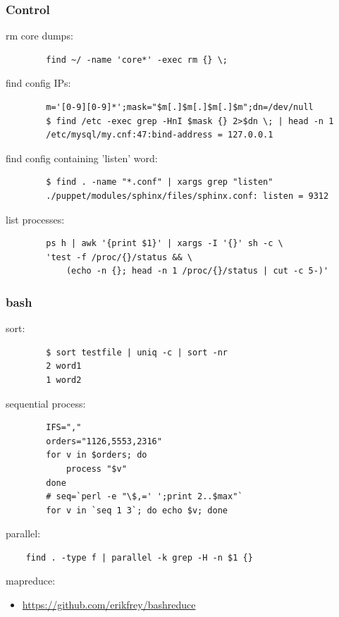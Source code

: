 \documentclass[hyperref={unicode=true}]{beamer}
\begin{document}
\begin{frame}[fragile]
	\frametitle{Control}

	rm core dumps:
	\begin{addmargin}[1em]{0em}
	\begin{verbatim}
		find ~/ -name 'core*' -exec rm {} \;
	\end{verbatim}
	\end{addmargin}

	find config IPs:
	\begin{addmargin}[1em]{0em}
	\begin{verbatim}
		m='[0-9][0-9]*';mask="$m[.]$m[.]$m[.]$m";dn=/dev/null
		$ find /etc -exec grep -HnI $mask {} 2>$dn \; | head -n 1
		/etc/mysql/my.cnf:47:bind-address = 127.0.0.1
	\end{verbatim}
	\end{addmargin}

	find config containing 'listen' word:
	\begin{addmargin}[1em]{0em}
	\begin{verbatim}
		$ find . -name "*.conf" | xargs grep "listen"
		./puppet/modules/sphinx/files/sphinx.conf: listen = 9312
	\end{verbatim}
	\end{addmargin}

	list processes:
	\begin{addmargin}[1em]{0em}
	\begin{verbatim}
		ps h | awk '{print $1}' | xargs -I '{}' sh -c \
		'test -f /proc/{}/status && \
			(echo -n {}; head -n 1 /proc/{}/status | cut -c 5-)'
	\end{verbatim}
	\end{addmargin}
\end{frame}

\begin{frame}[fragile]
	\frametitle{bash}
	sort:
	\begin{addmargin}[1em]{0em}
		\begin{verbatim}
		$ sort testfile | uniq -c | sort -nr
		2 word1
		1 word2
		\end{verbatim}
	\end{addmargin}

	sequential process:
	\begin{addmargin}[1em]{0em}
		\begin{verbatim}
		IFS=","
		orders="1126,5553,2316"
		for v in $orders; do
		    process "$v"
		done
		# seq=`perl -e "\$,=' ';print 2..$max"`
		for v in `seq 1 3`; do echo $v; done
		\end{verbatim}
	\end{addmargin}

	parallel:
	\begin{addmargin}[1em]{0em}
		\begin{verbatim}
	find . -type f | parallel -k grep -H -n $1 {}
		\end{verbatim}
	\end{addmargin}
	mapreduce:
	\begin{itemize}
		\item \url{https://github.com/erikfrey/bashreduce}
	\end{itemize}
\end{frame}
\end{document}
